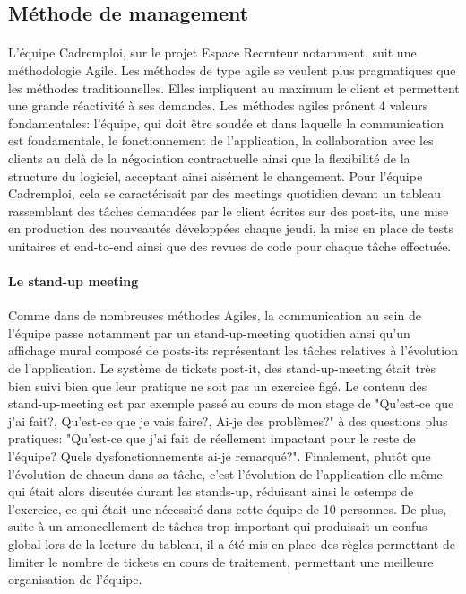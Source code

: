 \subsection{Méthode de management}
\label{sub:Méthode de management}
\paragraph{}
L'équipe Cadremploi, sur le projet Espace Recruteur notamment, suit une méthodologie Agile.
Les méthodes de type agile se veulent plus pragmatiques que les méthodes traditionnelles.
Elles impliquent au maximum le client et permettent une grande réactivité à ses demandes.
Les méthodes agiles prônent 4 valeurs fondamentales: l'équipe, qui doit être soudée et dans laquelle la communication est fondamentale, le fonctionnement de l'application, la collaboration avec les clients au delà de la négociation contractuelle ainsi que la flexibilité de la structure du logiciel, acceptant ainsi aisément le changement.
Pour l'équipe Cadremploi, cela se caractérisait par des meetings quotidien devant un tableau rassemblant des tâches demandées par le client écrites sur des post-its, une mise en production des nouveautés développées chaque jeudi, la mise en place de tests unitaires et end-to-end ainsi que des revues de code pour chaque tâche effectuée.
\paragraph{Le stand-up meeting}
Comme dans de nombreuses méthodes Agiles, la communication au sein de l'équipe passe notamment par un stand-up-meeting quotidien ainsi qu'un affichage mural composé de posts-its représentant les tâches relatives à l'évolution de l'application.
Le système de tickets post-it, des stand-up-meeting était très bien suivi bien que leur pratique ne soit pas un exercice figé.
Le contenu des stand-up-meeting est par exemple passé au cours de mon stage de "Qu'est-ce que j'ai fait?, Qu'est-ce que je vais faire?, Ai-je des problèmes?" à des questions plus pratiques: "Qu'est-ce que j'ai fait de réellement impactant pour le reste de l'équipe? Quels dysfonctionnements ai-je remarqué?".
Finalement, plutôt que l'évolution de chacun dans sa tâche, c'est l'évolution de l'application elle-même qui était alors discutée durant les stands-up, réduisant ainsi le œtemps de l'exercice, ce qui était une nécessité dans cette équipe de 10 personnes.
De plus, suite à un amoncellement de tâches trop important qui produisait un confus global lors de la lecture du tableau, il a été mis en place des règles permettant de limiter le nombre de tickets en cours de traitement, permettant une meilleure organisation de l'équipe.
